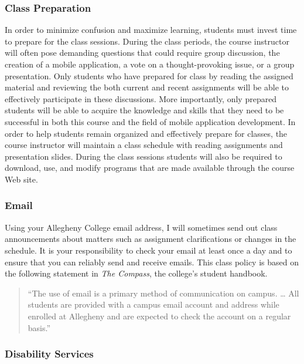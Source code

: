 \subsubsection*{Class Preparation}

In order to minimize confusion and maximize learning, students must invest time to prepare for the class sessions.
During the class periods, the course instructor will often pose demanding questions that could require group discussion,
the creation of a mobile application, a vote on a thought-provoking issue, or a group presentation.  Only students who
have prepared for class by reading the assigned material and reviewing the both current and recent assignments will be
able to effectively participate in these discussions.  More importantly, only prepared students will be able to acquire
the knowledge and skills that they need to be successful in both this course and the field of mobile application
development.  In order to help students remain organized and effectively prepare for classes, the course instructor will
maintain a class schedule with reading assignments and presentation slides.   During the class sessions students will
also be required to download, use, and modify programs that are made available through the course Web site.

\subsubsection*{Email}

Using your Allegheny College email address, I will sometimes send out class announcements about matters such as
assignment clarifications or changes in the schedule. It is your responsibility to check your email at least once a day
and to ensure that you can reliably send and receive emails. This class policy is based on the following statement in
{\em The Compass}, the college's student handbook.

\vspace*{-.1in}
\begin{quote}
``The use of email is a primary method of communication on campus. \ldots
All students are provided with a campus email account and address while
enrolled at Allegheny and are expected to check the account on a regular
basis.'' 
\end{quote}
\vspace*{-.15in}

\subsubsection*{Disability Services}

